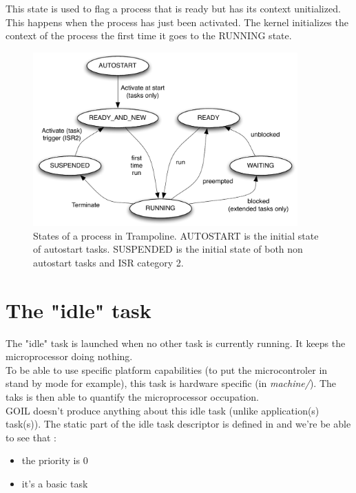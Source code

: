 This state is used to flag a process that is ready but has its context unitialized. This happens when the process has just been activated. The kernel initializes the context of the process the first time it goes to the RUNNING state.

\begin{figure}[htbp] %
   \centering
   \includegraphics[width=4in]{pictures/states.pdf} 
   \caption{States of a process in Trampoline. AUTOSTART is the initial state of autostart tasks. SUSPENDED is the initial state of both non autostart tasks and ISR category 2.}
   \label{fig:states}
\end{figure} 


\section{The "idle" task}

The "idle" task is launched when no other task is currently running. It keeps the microprocessor doing nothing.\\
To be able to use specific platform capabilities (to put the microcontroler in stand by mode for example), this task is hardware specific (in \textit{machine/}). The taks is then able to quantify the microprocessor occupation.\\
GOIL doesn't produce anything about this idle task (unlike application(s) task(s)). The static part of the idle task descriptor is defined in  and we're be able to see that :
\begin{itemize}
\item the priority is 0
\item it's a basic task
\end{itemize}
